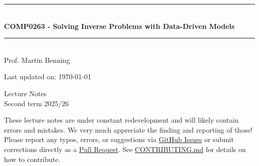 \documentclass[11pt, a4paper]{book}
\theoremstyle{plain}
\theoremstyle{definition}
\newcommand{\HRule}{\rule{\linewidth}{0.5mm}}
\begin{document}
\begin{titlepage}
\begin{center}

\HRule \\[0.5cm]
{ \huge \bfseries COMP0263 - Solving Inverse Problems with Data-Driven Models}
\HRule \\[2.5cm]

{\Large Prof. Martin Benning\\}

\vspace{1.5cm}

{Last updated on: \today}

\vfill

{\large Lecture Notes\\
Second term 2025/26}

\end{center}

\vspace*{4cm}

\doclicenseThis

\end{titlepage}

\tableofcontents

\vspace{1cm}

\noindent These lecture notes are under constant redevelopment and will likely contain errors and mistakes. We very much appreciate the finding and reporting of those! Please report any typos, errors, or suggestions via \href{https://github.com/UCL-COMP0263-2026/Course-Materials/issues}{GitHub Issues} or submit corrections directly as a \href{https://github.com/UCL-COMP0263-2026/Course-Materials/pulls}{Pull Request}. See \href{https://github.com/UCL-COMP0263-2026/Course-Materials/blob/main/CONTRIBUTING.md}{CONTRIBUTING.md} for details on how to contribute.

























\end{document}
